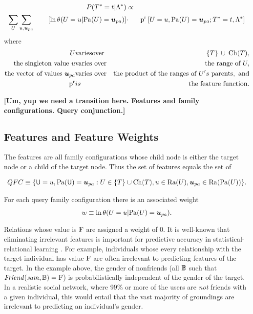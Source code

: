 \documentclass[runningheads,a4paper]{llncs}
\renewcommand{\Qconj}{\Appendterm{\FG{\TT} = \TV} {\QC}} %
\newcommand{\fixneeded}[1]{\textbf{[\footnotesize #1]}}
\begin{document}
\begin{definition}\label{def:log-diff-freq-eq}
\begin{eqnarray*}
  \Gprob{\FG{\TT} = \TV} {\QC} &\propto &  \\
 \sum_{\UT} \sum_{\UV,\Prange{\UT}}   
\qquad \left[ \ln \cprob{\UT = \UV}{\Pa{\UT} = \Prange{\UT}} \right] &
    \cdot &
    \Relfreq{\Appendterm{\UT  = \UV} {\Pa{\UT} = \Prange{\UT}}} {\Qconj}
\end{eqnarray*}
where 
\begin{eqnarray*}
\UT &\mathrm{varies over} & \Setaddterm{\{\TT\}} {\Ch{\TT}}, \\
\mbox{the singleton value} \ \UV & \mbox{varies over} & \mbox{the range of}\  \UT,\\
\mbox{the vector of values} \ \Prange{\UT} & \mbox{varies over} & \mbox{the product of the ranges of} \ \UT's\ \mbox{parents}, \ \mbox{and} \\
\Relevant{\Fvar} & is & \mbox{the feature function}.
\end{eqnarray*}
\end{definition}

\fixneeded{Um, yup we need a transition here. Features and family configurations. Query conjunction.}

\subsection{Features and Feature Weights} \label{sec:features} The features are all family configurations whose child node is either the target node or a child of the target node. Thus the set of features equals the set of 

$$\QFC \equiv \{\Appendterm{\UI  = \UV} {\Pa{\UI} = \Prange{\UT}}: \UT \in \{\TT\} \cup \Ch{\TT}, \UV \in \Range{\UT}, \Prange{\UT} \in  \Range{\Pa{\UT}}\}.$$

For each query family configuration 
there is an associated weight $$w \equiv  \ln \cprob{\UT = \UV}{\Pa{\UT} = \Prange{\UT}}  .$$

Relations whose value is $\mathrm{F}$ are assigned a weight of 0.
It is well-known that eliminating irrelevant features is important for predictive accuracy in statistical-relational learning \cite{Getoor2007c,Ngo1997,Natarajan2008,Heckerman+al:SRL07}. For example, individuals whose every relationship with the target individual has value $\mathrm{F}$ are often irrelevant to predicting features of the target. In the example above, the gender of nonfriends (all $\mathbb{B}$ such that $\it{Friend}(sam, \mathbb{B}) = \mathrm{F}$) is probabilistically independent of the gender of the target. In a realistic social network, where 99\% or more of the users are {\em not} friends with a given individual, this would entail that the vast majority of groundings are irrelevant to predicting an individual's gender.
\end{document}
